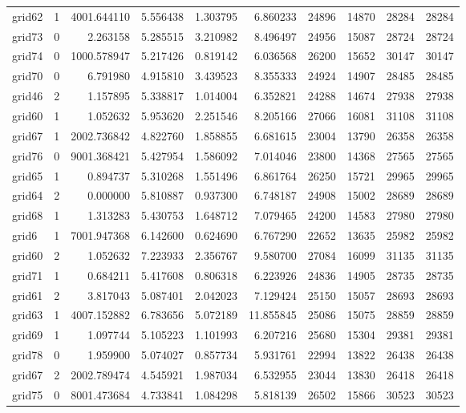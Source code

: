 \begin{longtable}{|l|r|r|r|r|r|r|r|r|r|}
grid62 & 1 & 4001.644110 & 5.556438 & 1.303795 & 6.860233 & 24896 & 14870 & 28284 & 28284 \\
grid73 & 0 & 2.263158 & 5.285515 & 3.210982 & 8.496497 & 24956 & 15087 & 28724 & 28724 \\
grid74 & 0 & 1000.578947 & 5.217426 & 0.819142 & 6.036568 & 26200 & 15652 & 30147 & 30147 \\
grid70 & 0 & 6.791980 & 4.915810 & 3.439523 & 8.355333 & 24924 & 14907 & 28485 & 28485 \\
grid46 & 2 & 1.157895 & 5.338817 & 1.014004 & 6.352821 & 24288 & 14674 & 27938 & 27938 \\
grid60 & 1 & 1.052632 & 5.953620 & 2.251546 & 8.205166 & 27066 & 16081 & 31108 & 31108 \\
grid67 & 1 & 2002.736842 & 4.822760 & 1.858855 & 6.681615 & 23004 & 13790 & 26358 & 26358 \\
grid76 & 0 & 9001.368421 & 5.427954 & 1.586092 & 7.014046 & 23800 & 14368 & 27565 & 27565 \\
grid65 & 1 & 0.894737 & 5.310268 & 1.551496 & 6.861764 & 26250 & 15721 & 29965 & 29965 \\
grid64 & 2 & 0.000000 & 5.810887 & 0.937300 & 6.748187 & 24908 & 15002 & 28689 & 28689 \\
grid68 & 1 & 1.313283 & 5.430753 & 1.648712 & 7.079465 & 24200 & 14583 & 27980 & 27980 \\
grid6 & 1 & 7001.947368 & 6.142600 & 0.624690 & 6.767290 & 22652 & 13635 & 25982 & 25982 \\
grid60 & 2 & 1.052632 & 7.223933 & 2.356767 & 9.580700 & 27084 & 16099 & 31135 & 31135 \\
grid71 & 1 & 0.684211 & 5.417608 & 0.806318 & 6.223926 & 24836 & 14905 & 28735 & 28735 \\
grid61 & 2 & 3.817043 & 5.087401 & 2.042023 & 7.129424 & 25150 & 15057 & 28693 & 28693 \\
grid63 & 1 & 4007.152882 & 6.783656 & 5.072189 & 11.855845 & 25086 & 15075 & 28859 & 28859 \\
grid69 & 1 & 1.097744 & 5.105223 & 1.101993 & 6.207216 & 25680 & 15304 & 29381 & 29381 \\
grid78 & 0 & 1.959900 & 5.074027 & 0.857734 & 5.931761 & 22994 & 13822 & 26438 & 26438 \\
grid67 & 2 & 2002.789474 & 4.545921 & 1.987034 & 6.532955 & 23044 & 13830 & 26418 & 26418 \\
grid75 & 0 & 8001.473684 & 4.733841 & 1.084298 & 5.818139 & 26502 & 15866 & 30523 & 30523 \\

\end{longtable}

